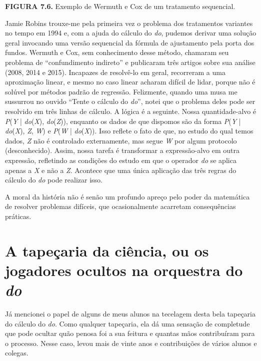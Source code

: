 \documentclass[11pt,a5paper,twoside]{book}
\begin{document}
\textbf{FIGURA 7.6.} Exemplo de Wermuth e Cox de um tratamento sequencial.

Jamie Robins trouxe-me pela primeira vez o problema dos tratamentos variantes no tempo em 1994 e, com a ajuda do cálculo do \textit{do}, pudemos derivar uma solução geral invocando uma versão sequencial da fórmula de ajustamento pela porta dos fundos. Wermuth e Cox, sem conhecimento desse método, chamaram seu problema de “confundimento indireto” e publicaram três artigos sobre sua análise (2008, 2014 e 2015). Incapazes de resolvê-lo em geral, recorreram a uma aproximação linear, e mesmo no caso linear acharam difícil de lidar, porque não é solúvel por métodos padrão de regressão. Felizmente, quando uma musa me sussurrou no ouvido “Tente o cálculo do \textit{do}”, notei que o problema deles pode ser resolvido em três linhas de cálculo. A lógica é a seguinte. Nossa quantidade-alvo é \textit{P}(\textit{Y} | \textit{do}(\textit{X}), \textit{do}(\textit{Z})), enquanto os dados de que dispomos são da forma \textit{P}(\textit{Y} | \textit{do}(\textit{X}), \textit{Z}, \textit{W}) e \textit{P}(\textit{W} | \textit{do}(\textit{X})). Isso reflete o fato de que, no estudo do qual temos dados, \textit{Z} não é controlado externamente, mas segue \textit{W} por algum protocolo (desconhecido). Assim, nossa tarefa é transformar a expressão-alvo em outra expressão, refletindo as condições do estudo em que o operador \textit{do} se aplica apenas a \textit{X} e não a \textit{Z}. Acontece que uma única aplicação das três regras do cálculo do \textit{do} pode realizar isso.

A moral da história não é senão um profundo apreço pelo poder da matemática de resolver problemas difíceis, que ocasionalmente acarretam consequências práticas.

\section{A tapeçaria da ciência, ou os jogadores ocultos na orquestra do \textit{do}}
Já mencionei o papel de alguns de meus alunos na tecelagem desta bela tapeçaria do cálculo do \textit{do}. Como qualquer tapeçaria, ela dá uma sensação de completude que pode ocultar quão penosa foi a sua feitura e quantas mãos contribuíram para o processo. Nesse caso, levou mais de vinte anos e contribuições de vários alunos e colegas.
\end{document}
